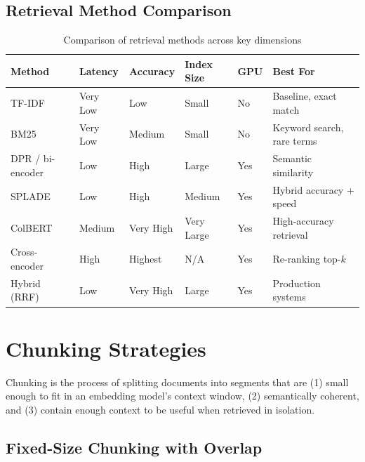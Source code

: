\subsection{Retrieval Method Comparison}
\label{retrieval-method-comparison}

\begin{table}[ht!]
\centering
\caption{Comparison of retrieval methods across key dimensions}
\label{tab:retrieval_methods}
{\footnotesize
\begin{tabular}{@{}llllll@{}}
\toprule
\textbf{Method} & \textbf{Latency} & \textbf{Accuracy} & \textbf{Index Size} & \textbf{GPU} & \textbf{Best For} \\
\midrule
TF-IDF \cite{sparckjones1972idf} & Very Low & Low & Small & No & Baseline, exact match \\
BM25 \cite{robertson2009probabilistic} & Very Low & Medium & Small & No & Keyword search, rare terms \\
DPR / bi-encoder \cite{karpukhin2020dense} & Low & High & Large & Yes & Semantic similarity \\
SPLADE \cite{formal2021splade} & Low & High & Medium & Yes & Hybrid accuracy + speed \\
ColBERT \cite{khattab2020colbert} & Medium & Very High & Very Large & Yes & High-accuracy retrieval \\
Cross-encoder \cite{nogueira2019passage} & High & Highest & N/A & Yes & Re-ranking top-$k$ \\
Hybrid (RRF) \cite{cormack2009reciprocal} & Low & Very High & Large & Yes & Production systems \\
\bottomrule
\end{tabular}
}
\end{table}

\section{Chunking Strategies}
\label{sec:chunking}

Chunking is the process of splitting documents into segments that are (1) small enough to fit in an embedding model’s context window, (2) semantically coherent, and (3) contain enough context to be useful when retrieved in isolation.

\subsection{Fixed-Size Chunking with Overlap}
\label{fixed-size-chunking-with-overlap}


